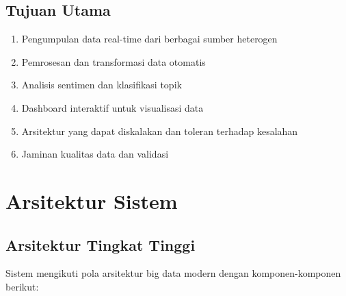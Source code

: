 \documentclass[12pt,a4paper]{article}
\begin{document}
\subsection{Tujuan Utama}
\begin{enumerate}
    \item Pengumpulan data real-time dari berbagai sumber heterogen
    \item Pemrosesan dan transformasi data otomatis
    \item Analisis sentimen dan klasifikasi topik
    \item Dashboard interaktif untuk visualisasi data
    \item Arsitektur yang dapat diskalakan dan toleran terhadap kesalahan
    \item Jaminan kualitas data dan validasi
\end{enumerate}

\section{Arsitektur Sistem}

\subsection{Arsitektur Tingkat Tinggi}
Sistem mengikuti pola arsitektur big data modern dengan komponen-komponen berikut:
\end{document}
